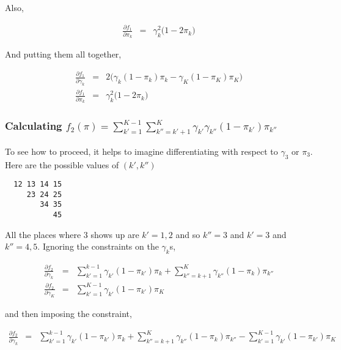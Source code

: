 \documentclass[11pt]{article}
\begin{document}
Also, 

\begin{eqnarray}
\frac{\partial f_1}{\partial \pi_{k} } & = & \gamma_k^2\bigl(1 - 2 \pi_k\bigr)
\end{eqnarray}

And putting them all together,

\begin{eqnarray}
\frac{\partial f_1}{\partial \gamma_{k} } & = &
                2 \biggl(\gamma_k (1-\pi_k)\pi_k - \gamma_K
                (1-\pi_K)\pi_K\biggr) \\
\frac{\partial f_1}{\partial \pi_{k} } & = & \gamma_k^2\bigl(1 - 2
                \pi_k\bigr) 
\end{eqnarray}

\subsubsection{Calculating $f_2(\pi)  =
              \sum_{k'=1}^{K-1}\sum_{k''=k'+1}^K
              \gamma_{k'} \gamma_{k''}
              (1-\pi_{k'}) \pi_{k''}$}

To see how to proceed, it helps to imagine 
differentiating with respect to $\gamma_3$ or $\pi_3$.  Here are the possible
values of $(k',k'')$

\begin{verbatim}
  12 13 14 15
     23 24 25
        34 35
           45
\end{verbatim}

All the places where 3 shows up are $k'=1,2$ and so $k'' = 3$ and
$k'=3$ and $k'' = 4,5$. Ignoring the constraints on the
$\gamma_k$s, 

\begin{eqnarray}
\frac{\partial f_2}{\partial \gamma_{k} }  & = & 
                 \sum_{k'=1}^{k-1} \gamma_{k'} (1-\pi_{k'}) \pi_{k}
                 +\sum_{k'' = k+1}^K\gamma_{k''}(1-\pi_k)\pi_{k''}
                 \\
\frac{\partial f_2}{\partial \gamma_{K} }  & = & 
                   \sum_{k'=1}^{K-1} \gamma_{k'} (1-\pi_{k'}) \pi_{K}
\end{eqnarray}

and then imposing the constraint, 

\begin{eqnarray}
\frac{\partial f_2}{\partial \gamma_{k} }  & = & 
                 \sum_{k'=1}^{k-1} \gamma_{k'} (1-\pi_{k'}) \pi_{k}
                 +\sum_{k'' = k+1}^K\gamma_{k''}(1-\pi_k)\pi_{k''}
                 -\sum_{k'=1}^{K-1} \gamma_{k'} (1-\pi_{k'}) \pi_{K}
\end{eqnarray}
\end{document}
